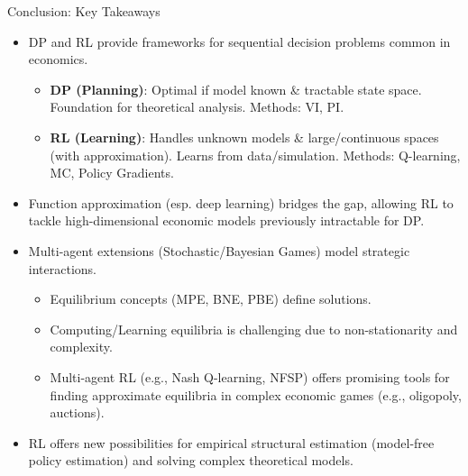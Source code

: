 \documentclass[10pt]{beamer}
\begin{document}

\begin{frame}{Conclusion: Key Takeaways}
    \begin{itemize}
        \item DP and RL provide frameworks for sequential decision problems common in economics.
        \begin{itemize}
            \item \textbf{DP (Planning)}: Optimal if model known & tractable state space. Foundation for theoretical analysis. Methods: VI, PI.
            \item \textbf{RL (Learning)}: Handles unknown models & large/continuous spaces (with approximation). Learns from data/simulation. Methods: Q-learning, MC, Policy Gradients.
        \end{itemize}
        \vspace{0.2cm}
        \item Function approximation (esp. deep learning) bridges the gap, allowing RL to tackle high-dimensional economic models previously intractable for DP.
        \vspace{0.2cm}
        \item Multi-agent extensions (Stochastic/Bayesian Games) model strategic interactions.
        \begin{itemize}
            \item Equilibrium concepts (MPE, BNE, PBE) define solutions.
            \item Computing/Learning equilibria is challenging due to non-stationarity and complexity.
            \item Multi-agent RL (e.g., Nash Q-learning, NFSP) offers promising tools for finding approximate equilibria in complex economic games (e.g., oligopoly, auctions).
        \end{itemize}
        \vspace{0.2cm}
        \item RL offers new possibilities for empirical structural estimation (model-free policy estimation) and solving complex theoretical models.
    \end{itemize}
\end{frame}

\end{document}
